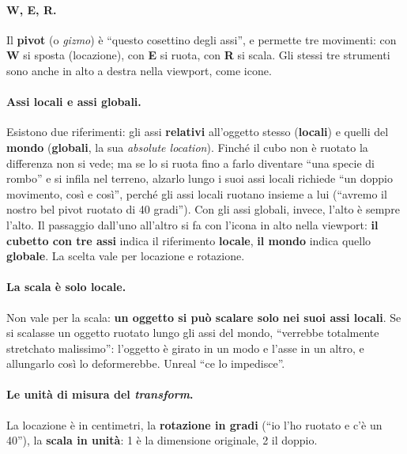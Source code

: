 \paragraph{W, E, R.} Il \textbf{pivot} (o \emph{gizmo}) è ``questo cosettino degli
assi'', e permette tre movimenti: con \textbf{W} si sposta (locazione), con \textbf{E} si
ruota, con \textbf{R} si scala. Gli stessi tre strumenti sono anche in alto a destra
nella viewport, come icone.

\paragraph{Assi locali e assi globali.} Esistono due riferimenti: gli assi
\textbf{relativi} all'oggetto stesso (\textbf{locali}) e quelli del \textbf{mondo}
(\textbf{globali}, la sua \emph{absolute location}). Finché il cubo non è ruotato la
differenza non si vede; ma se lo si ruota fino a farlo diventare ``una specie di rombo''
e si infila nel terreno, alzarlo lungo i suoi assi locali richiede ``un doppio
movimento, così e così'', perché gli assi locali ruotano insieme a lui (``avremo il
nostro bel pivot ruotato di 40 gradi''). Con gli assi globali, invece, l'alto è sempre
l'alto. Il passaggio dall'uno all'altro si fa con l'icona in alto nella viewport:
\textbf{il cubetto con tre assi} indica il riferimento \textbf{locale}, \textbf{il
mondo} indica quello \textbf{globale}. La scelta vale per locazione e rotazione.

\paragraph{La scala è solo locale.} Non vale per la scala: \textbf{un oggetto si può
scalare solo nei suoi assi locali}. Se si scalasse un oggetto ruotato lungo gli assi del
mondo, ``verrebbe totalmente stretchato malissimo'': l'oggetto è girato in un modo e
l'asse in un altro, e allungarlo così lo deformerebbe. Unreal ``ce lo impedisce''.

\paragraph{Le unità di misura del \emph{transform}.} La locazione è in centimetri, la
\textbf{rotazione in gradi} (``io l'ho ruotato e c'è un 40''), la \textbf{scala in
unità}: 1 è la dimensione originale, 2 il doppio.

